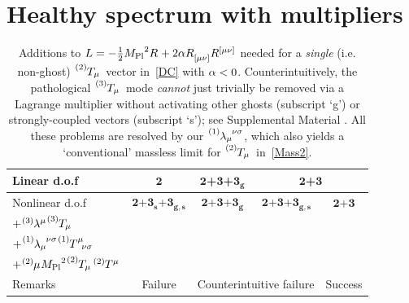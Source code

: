 \documentclass[aps,prd,reprint,preprintnumbers,showpacs,floatfix,nofootinbib,superscript address,longbibliography]{revtex4-1}
\newcommand{\cmark}{\hspace{5pt}\color{black}\ding{51}\hspace{5pt}}%
\newcommand{\xmark}{\hspace{5pt}\color{black}\ding{55}\hspace{5pt}}%
\newcommand{\UnitaryTensor}{\color{SeaGreen}$\mathbf{2}$\color{black}}%
\newcommand{\UnitaryVector}{\color{SeaGreen}$\mathbf{3}$\color{black}}%
\newcommand{\GhostVector}{\color{red}$\mathbf{3_{\mathrm{\mathbf{g}}}}$\color{black}}%
\newcommand{\UnitaryStrongVector}{\color{red}$\mathbf{3}_{\mathrm{\mathbf{s}}}$\color{black}}%
\newcommand{\GhostStrongVector}{\color{red}$\mathbf{3}_{\mathrm{\mathbf{g,s}}}$\color{black}}%
\begin{document}
\section{Healthy spectrum with multipliers} 
\begin{table}
\begin{tabularx}{\linewidth}{X|c|c|c|c|c|c|c|c}
\hline\hline
	Linear d.o.f & \UnitaryTensor{} & \multicolumn{3}{c|}{\UnitaryTensor{}+\UnitaryVector{}+\GhostVector{}} & \multicolumn{4}{c}{\UnitaryTensor{}+\UnitaryVector{}}\\
\hline
	Nonlinear d.o.f & \UnitaryTensor{}+\UnitaryStrongVector{}+\GhostStrongVector{} & \multicolumn{3}{c|}{\UnitaryTensor{}+\UnitaryVector{}+\GhostVector{}} & \multicolumn{2}{c|}{\UnitaryTensor{}+\UnitaryVector{}+\GhostStrongVector{}} & \multicolumn{2}{c}{\UnitaryTensor{}+\UnitaryVector{}}\\
\hline
	$+\TLambda[3]{^\mu}\T[3]{_\mu}$ &\xmark &\xmark &\xmark &\cmark &\cmark &\xmark &\cmark &\cmark \\
	$+\TLambda[1]{_{\mu}^{\nu\sigma}}\T[1]{^{\mu}_{\nu\sigma}}$ &\xmark &\cmark &\cmark &\xmark &\xmark &\xmark &\cmark &\cmark \\
	$+\bet{2}\Planck^2\T[2]{_{\mu}}\T[2]{^{\mu}}$ &\xmark &\xmark &\cmark &\cmark &\xmark &\cmark &\xmark &\cmark \\
\hline
	Remarks & {\color{red}Failure} & \multicolumn{5}{c|}{{\color{red}Counterintuitive failure}} & \multicolumn{2}{c}{{\color{SeaGreen}Success}}\\
\hline\hline
\end{tabularx}
	\caption{\label{WhacAMole} Additions to $L=-\frac{1}{2}\Planck^2\rcR{}+2\alp{5}\rcR{_{[\mu\nu]}}\rcR{^{[\mu\nu]}}$ needed for a \emph{single} (i.e. non-ghost) $\T[2]{_{\mu}}$ vector in~\cref{DC} with $\alp{5}<0$. Counterintuitively, the pathological $\T[3]{_{\mu}}$ mode \emph{cannot} just trivially be removed via a Lagrange multiplier without activating other ghosts (subscript `g') or strongly-coupled vectors (subscript `s'); see Supplemental Material \cite{NonTrivialMultipliers}.
		All these problems are resolved by our $\TLambda[1]{_{\mu}^{\nu\sigma}}$, which also yields a `conventional' massless limit for $\T[2]{_{\mu}}$ in~\cref{Mass2}.}
\end{table}
\end{document}
